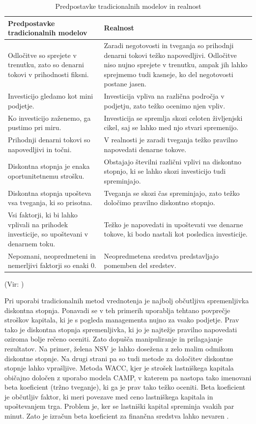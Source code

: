 \documentclass[12pt, a4paper]{amsart}
\theoremstyle{definition} %
\theoremstyle{plain} %
\begin{document}
\pagebreak
\begin{table}[ht]
	\caption{Predpostavke tradicionalnih modelov in realnost}
	\centering
	\begin{tabular}{|L|L|}
	\hline
	\textbf{Predpostavke tradicionalnih modelov} & \textbf{Realnost} \\
	\hline
	\hline
	Odločitve so sprejete v trenutku, zato so denarni tokovi v prihodnosti fiksni. & Zaradi negotovosti in tveganja so prihodnji denarni tokovi težko napovedljivi. Odločitve niso nujno sprejete v trenutku, ampak jih lahko sprejmemo tudi kasneje, ko del negotovosti postane jasen. \\
	\hline
	Investicijo gledamo kot mini podjetje. &  Investicija vpliva na različna področja v podjetju, zato težko ocenimo njen vpliv. \\
	\hline
	Ko investicijo zaženemo, ga pustimo pri miru. & Investicija se spremlja skozi celoten življenjski cikel, saj se lahko med njo stvari spremenijo. \\
	\hline
	Prihodnji denarni tokovi so napovedljivi in točni. & V realnosti je zaradi tveganja težko pravilno napovedati denarne tokove. \\
	\hline
	Diskontna stopnja je enaka oportunitetnemu strošku. & Obstajajo številni različni vplivi na diskontno stopnjo, ki se lahko skozi investicijo tudi spreminjajo.\\
	\hline
	Diskontna stopnja upošteva vsa tveganja, ki so prisotna. & Tveganja se skozi čas spreminjajo, zato težko določimo pravilno diskontno stopnjo. \\
	\hline
	Vsi faktorji, ki bi lahko vplivali na prihodek investicije, so upoštevani v denarnem toku. & Težko je napovedati in upoštevati vse denarne tokove, ki bodo nastali kot posledica investicije. \\
	\hline
	Nepoznani, neopredmeteni in nemerljivi faktorji so enaki 0. & Neopredmetena sredstva predstavljajo pomemben del sredstev. \\
	\hline
	\end{tabular}
\end{table} 
(Vir: \cite[str. 67]{Mun})



Pri uporabi tradicionalnih metod vrednotenja je najbolj občutljiva spremenljivka diskontna stopnja. Ponavadi se v teh primerih uporablja tehtano povprečje stroškov kapitala, ki je s pogleda managementa nujno za vsako podjetje. Prav tako je diskontna stopnja spremenljivka, ki jo je najtežje pravilno napovedati oziroma bolje rečeno oceniti. Zato dopušča manipuliranje in prilagajanje rezultatov. Na primer, želena NSV je lahko dosežena z zelo malim odmikom diskontne stopnje. Na drugi strani pa so tudi metode za določitev diskontne stopnje lahko vprašljive. Metoda WACC, kjer je strošek lastniškega kapitala običajno določen z uporabo modela CAMP, v katerem pa nastopa tako imenovani beta koeficient (tržno tveganje), ki ga je prav tako težko oceniti. Beta koeficient je občutljiv faktor, ki meri povezave med ceno lastniškega kapitala in upoštevanjem trga. Problem je, ker se lastniški kapital spreminja vsakih par minut. Zato je izračun beta koeficient za finančna sredstva lahko nevaren \cite[str. 69, 70]{Mun}.\\
 
\end{document}
